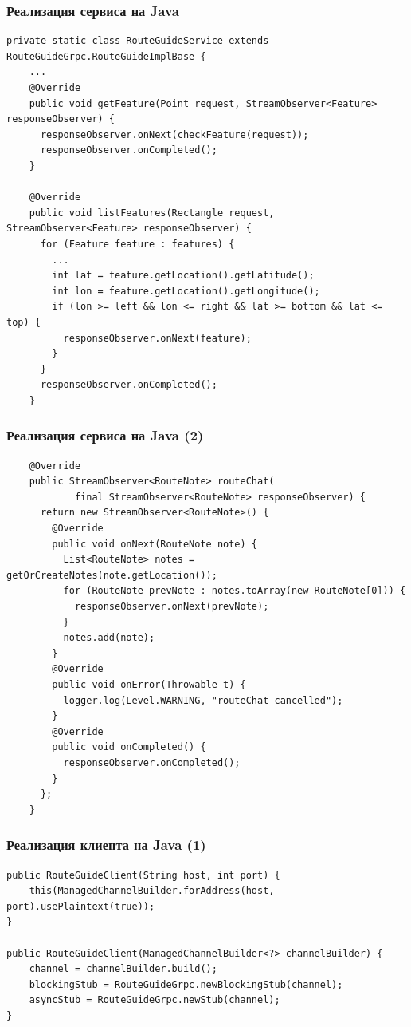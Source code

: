 \documentclass[xetex,mathserif,serif]{beamer}
\begin{document}
	\begin{frame}[fragile]
		\frametitle{Реализация сервиса на Java}
		\begin{scriptsize}
			\begin{verbatim}
private static class RouteGuideService extends RouteGuideGrpc.RouteGuideImplBase {
    ...
    @Override
    public void getFeature(Point request, StreamObserver<Feature> responseObserver) {
      responseObserver.onNext(checkFeature(request));
      responseObserver.onCompleted();
    }

    @Override
    public void listFeatures(Rectangle request, StreamObserver<Feature> responseObserver) {
      for (Feature feature : features) {
        ...
        int lat = feature.getLocation().getLatitude();
        int lon = feature.getLocation().getLongitude();
        if (lon >= left && lon <= right && lat >= bottom && lat <= top) {
          responseObserver.onNext(feature);
        }
      }
      responseObserver.onCompleted();
    }
			\end{verbatim}
		\end{scriptsize}
	\end{frame}

	\begin{frame}[fragile]
		\frametitle{Реализация сервиса на Java (2)}
		\begin{scriptsize}
			\begin{verbatim}
    @Override
    public StreamObserver<RouteNote> routeChat(
            final StreamObserver<RouteNote> responseObserver) {
      return new StreamObserver<RouteNote>() {
        @Override
        public void onNext(RouteNote note) {
          List<RouteNote> notes = getOrCreateNotes(note.getLocation());
          for (RouteNote prevNote : notes.toArray(new RouteNote[0])) {
            responseObserver.onNext(prevNote);
          }
          notes.add(note);
        }
        @Override
        public void onError(Throwable t) {
          logger.log(Level.WARNING, "routeChat cancelled");
        }
        @Override
        public void onCompleted() {
          responseObserver.onCompleted();
        }
      };
    }
			\end{verbatim}
		\end{scriptsize}
	\end{frame}

	\begin{frame}[fragile]
		\frametitle{Реализация клиента на Java (1)}
		\begin{scriptsize}
			\begin{verbatim}
public RouteGuideClient(String host, int port) {
    this(ManagedChannelBuilder.forAddress(host, port).usePlaintext(true));
}

public RouteGuideClient(ManagedChannelBuilder<?> channelBuilder) {
    channel = channelBuilder.build();
    blockingStub = RouteGuideGrpc.newBlockingStub(channel);
    asyncStub = RouteGuideGrpc.newStub(channel);
}
			\end{verbatim}
		\end{scriptsize}
	\end{frame}
\end{document}

